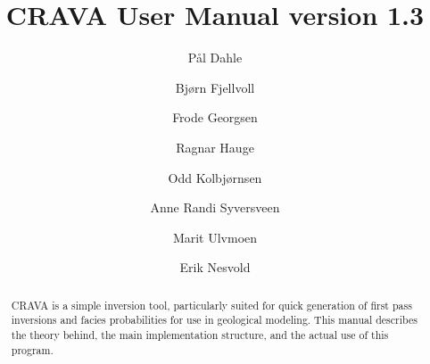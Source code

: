 \documentclass[screen,note,long,backref,indentpar]{nrdoc}
\title{CRAVA User Manual version 1.3}
\author{P{\aa}l Dahle\and Bj{\o}rn Fjellvoll \and Frode Georgsen\and Ragnar Hauge\and Odd Kolbj{\o}rnsen\and Anne Randi Syversveen\and Marit Ulvmoen \and Erik Nesvold}
\begin{document}
\maketitle

\begin{abstract}
CRAVA is a simple inversion tool, particularly suited for quick generation of first pass inversions and facies probabilities for use in geological modeling. This manual describes the theory behind, the main implementation structure, and the actual use of this program.
\end{abstract}

\tableofcontents
\clearemptydoublepage



\newpage

\newpage

\newpage



\appendix



\newpage

\newpage




\end{document}
